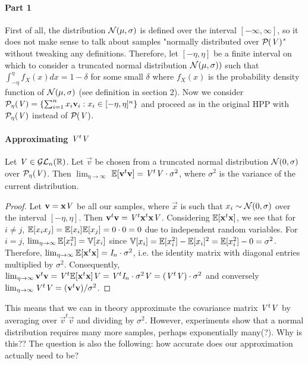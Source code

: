 \paragraph{Part 1}
First of all, the distribution $\normdist{\mu}{\sigma}$ is defined over the interval $[- \infty, \infty]$, so it does not make sense to talk about samples "normally distributed over $\PP{V}$" without tweaking any definitions.
Therefore, let $[- \eta, \eta]$ be a finite interval on which to consider a truncated normal distribution $\normdist{\mu}{\sigma})$ such that $\int_{-\eta}^{\eta} f_X(x) dx = 1 - \delta$ for some small $\delta$
where $f_X(x)$ is the probability density function of $\normdist{\mu}{\sigma}$ (see definition in section 2).
Now we consider $\PP[\eta]{V} = \{\sum_{i=1}^n x_i \vec{v}_i : x_i \in [-\eta, \eta]^n\}$ and proceed as in the original HPP with $\PP[\eta]{V}$ instead of $\PP{V}$.

\paragraph{Approximating $\mat{V}^t \mat{V}$}
Let $\mat{V} \in \GLnR$. Let $\vec{v}$ be chosen from a truncated normal distribution $\normdist{0}{\sigma}$ over $\PP[\eta]{V}$.
Then $\lim_{\eta\to\infty}$ $\bb{E}[\vec{v}^t\vec{v}] = \mat{V}^t \mat{V} \cdot \sigma^2$, where $\sigma^2$ is the variance of the current distribution.

\begin{proof}
    Let $\vec{v} = \vec{x}\mat{V}$ be all our samples, where $\vec{x}$ is such that $x_i \sim \normdist{0}{\sigma}$ over the interval $[-\eta, \eta]$.
Then $\vec{v}^t\vec{v} = \mat{V}^t \vec{x}^t \vec{x} \mat{V}$. Considering $\bb{E}[\vec{x}^t \vec{x}]$, we see that for $i \neq j$, 
$\bb{E}[x_i x_j] = \bb{E}[x_i] \bb{E}[x_j] = 0 \cdot 0 = 0$ due to independent random variables.
For $i=j$, $\lim_{\eta\to\infty} \bb{E}[x_i^2] = \bb{V}[x_i]$ since $\bb{V}[x_i] = \bb{E}[x_i^2] - \bb{E}[x_i]^2 = \bb{E}[x_i^2] - 0 = \sigma ^2$.
Therefore, $\lim_{\eta\to\infty} \bb{E}[\vec{x}^t \vec{x}] = \mat{I}_n \cdot \sigma^2$, i.e. the identity matrix with diagonal entries multiplied by $\sigma ^2$.
Consequently, $\lim_{\eta\to\infty} \vec{v}^t \vec{v} = \mat{V}^t \bb{E}[\vec{x}^t\vec{x}] \mat{V} = \mat{V}^t \mat{I}_n \cdot \sigma^2 \mat{V} = (\mat{V}^t \mat{V}) \cdot \sigma ^2$ 
and conversely $\lim_{\eta\to\infty} \mat{V}^t \mat{V} = (\vec{v}^t \vec{v})/ \sigma^2$.
\end{proof}

This means that we can in theory approximate the covariance matrix $\mat{V}^t \mat{V}$ by averaging over $\vec{v}^t \vec{v}$ and dividing by $\sigma ^2$. 
However, experiments show that a normal distribution requires many more samples, perhaps exponentially many(?). Why is this??
The question is also the following: how accurate does our approximation actually need to be?
